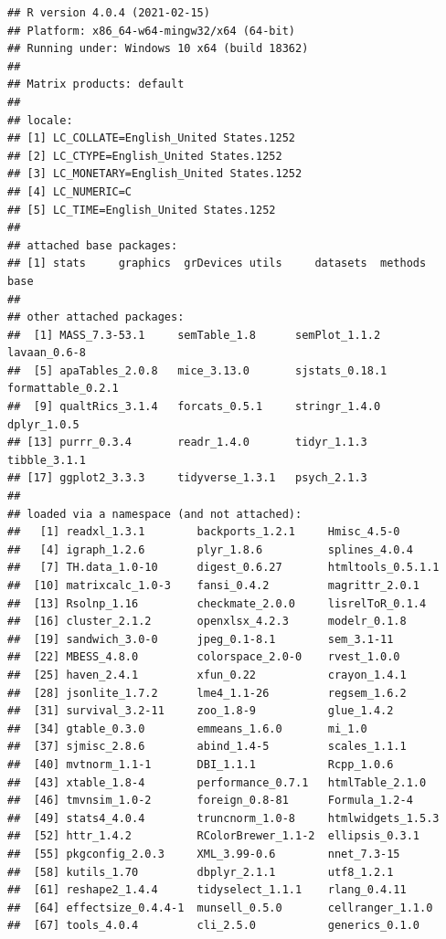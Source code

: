 \documentclass[
  english,
]{book}
\begin{document}
\begin{verbatim}
## R version 4.0.4 (2021-02-15)
## Platform: x86_64-w64-mingw32/x64 (64-bit)
## Running under: Windows 10 x64 (build 18362)
## 
## Matrix products: default
## 
## locale:
## [1] LC_COLLATE=English_United States.1252 
## [2] LC_CTYPE=English_United States.1252   
## [3] LC_MONETARY=English_United States.1252
## [4] LC_NUMERIC=C                          
## [5] LC_TIME=English_United States.1252    
## 
## attached base packages:
## [1] stats     graphics  grDevices utils     datasets  methods   base     
## 
## other attached packages:
##  [1] MASS_7.3-53.1     semTable_1.8      semPlot_1.1.2     lavaan_0.6-8     
##  [5] apaTables_2.0.8   mice_3.13.0       sjstats_0.18.1    formattable_0.2.1
##  [9] qualtRics_3.1.4   forcats_0.5.1     stringr_1.4.0     dplyr_1.0.5      
## [13] purrr_0.3.4       readr_1.4.0       tidyr_1.1.3       tibble_3.1.1     
## [17] ggplot2_3.3.3     tidyverse_1.3.1   psych_2.1.3      
## 
## loaded via a namespace (and not attached):
##   [1] readxl_1.3.1        backports_1.2.1     Hmisc_4.5-0        
##   [4] igraph_1.2.6        plyr_1.8.6          splines_4.0.4      
##   [7] TH.data_1.0-10      digest_0.6.27       htmltools_0.5.1.1  
##  [10] matrixcalc_1.0-3    fansi_0.4.2         magrittr_2.0.1     
##  [13] Rsolnp_1.16         checkmate_2.0.0     lisrelToR_0.1.4    
##  [16] cluster_2.1.2       openxlsx_4.2.3      modelr_0.1.8       
##  [19] sandwich_3.0-0      jpeg_0.1-8.1        sem_3.1-11         
##  [22] MBESS_4.8.0         colorspace_2.0-0    rvest_1.0.0        
##  [25] haven_2.4.1         xfun_0.22           crayon_1.4.1       
##  [28] jsonlite_1.7.2      lme4_1.1-26         regsem_1.6.2       
##  [31] survival_3.2-11     zoo_1.8-9           glue_1.4.2         
##  [34] gtable_0.3.0        emmeans_1.6.0       mi_1.0             
##  [37] sjmisc_2.8.6        abind_1.4-5         scales_1.1.1       
##  [40] mvtnorm_1.1-1       DBI_1.1.1           Rcpp_1.0.6         
##  [43] xtable_1.8-4        performance_0.7.1   htmlTable_2.1.0    
##  [46] tmvnsim_1.0-2       foreign_0.8-81      Formula_1.2-4      
##  [49] stats4_4.0.4        truncnorm_1.0-8     htmlwidgets_1.5.3  
##  [52] httr_1.4.2          RColorBrewer_1.1-2  ellipsis_0.3.1     
##  [55] pkgconfig_2.0.3     XML_3.99-0.6        nnet_7.3-15        
##  [58] kutils_1.70         dbplyr_2.1.1        utf8_1.2.1         
##  [61] reshape2_1.4.4      tidyselect_1.1.1    rlang_0.4.11       
##  [64] effectsize_0.4.4-1  munsell_0.5.0       cellranger_1.1.0   
##  [67] tools_4.0.4         cli_2.5.0           generics_0.1.0     

\end{verbatim}
\end{document}
